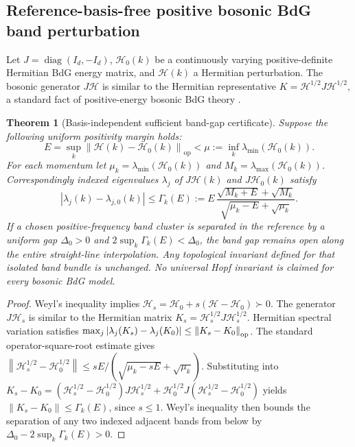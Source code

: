 \documentclass[aps,prd,onecolumn,notitlepage,11pt,superscriptaddress,longbibliography]{revtex4-2}
\newtheorem{theorem}{Theorem}
\newcommand{\norm}[1]{\left\lVert#1\right\rVert}
\begin{document}
\subsection{Reference-basis-free positive bosonic BdG band perturbation}
Let $J=\operatorname{diag}(I_d,-I_d)$, $\mathcal H_0(k)$ be a continuously varying positive-definite Hermitian BdG energy matrix, and $\mathcal H(k)$ a Hermitian perturbation. The bosonic generator $J\mathcal H$ is similar to the Hermitian representative $K=\mathcal H^{1/2}J\mathcal H^{1/2}$, a standard fact of positive-energy bosonic BdG theory \cite{BosonicTopology2020}.
\begin{theorem}[Basis-independent sufficient band-gap certificate]\label{th:v7bdg}
Suppose the following uniform positivity margin holds:\begin{equation}\label{eq:v11-bdgmargin} E=\sup_k\norm{\mathcal H(k)-\mathcal H_0(k)}_{\mathrm{op}}<\mu:=\inf_k\lambda_{\min}(\mathcal H_0(k)).\end{equation} For each momentum let $\mu_k=\lambda_{\min}(\mathcal H_0(k))$ and $M_k=\lambda_{\max}(\mathcal H_0(k))$. Correspondingly indexed eigenvalues $\lambda_j$ of $J\mathcal H(k)$ and $J\mathcal H_0(k)$ satisfy
\begin{equation}\boxed{|\lambda_j(k)-\lambda_{j,0}(k)|\le\Gamma_k(E):= E\,\frac{\sqrt{M_k+E}+\sqrt{M_k}}{\sqrt{\mu_k-E}+\sqrt{\mu_k}}.}\end{equation}
If a chosen positive-frequency band cluster is separated in the reference by a uniform gap $\Delta_0>0$ and $2\sup_k\Gamma_k(E)<\Delta_0$, the band gap remains open along the entire straight-line interpolation. Any topological invariant \emph{defined for that isolated band bundle} is unchanged. No universal Hopf invariant is claimed for every bosonic BdG model.
\end{theorem}
\begin{proof}
Weyl's inequality implies $\mathcal H_s=\mathcal H_0+s(\mathcal H-\mathcal H_0)\succ0$. The generator $J\mathcal H_s$ is similar to the Hermitian matrix $K_s=\mathcal H_s^{1/2}J\mathcal H_s^{1/2}$. Hermitian spectral variation satisfies $\max_j|\lambda_j(K_s)-\lambda_j(K_0)|\le\norm{K_s-K_0}_{\rm op}$. The standard operator-square-root estimate gives
$\norm{\mathcal H_s^{1/2}-\mathcal H_0^{1/2}}\le sE/(\sqrt{\mu_k-sE}+\sqrt{\mu_k})$. Substituting into
$K_s-K_0=(\mathcal H_s^{1/2}-\mathcal H_0^{1/2})J\mathcal H_s^{1/2}+\mathcal H_0^{1/2}J(\mathcal H_s^{1/2}-\mathcal H_0^{1/2})$
yields $\norm{K_s-K_0}\le\Gamma_k(E)$, since $s\le1$. Weyl's inequality then bounds the separation of any two indexed adjacent bands from below by $\Delta_0-2\sup_k\Gamma_k(E)>0$.
\end{proof}
\end{document}
